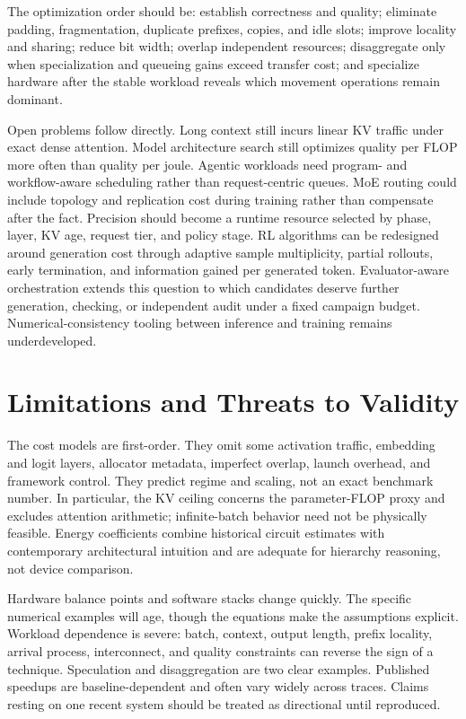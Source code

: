 \documentclass[journal]{IEEEtran}
\begin{document}
The optimization order should be: establish correctness and quality; eliminate padding, fragmentation, duplicate prefixes, copies, and idle slots; improve locality and sharing; reduce bit width; overlap independent resources; disaggregate only when specialization and queueing gains exceed transfer cost; and specialize hardware after the stable workload reveals which movement operations remain dominant.

Open problems follow directly. Long context still incurs linear KV traffic under exact dense attention. Model architecture search still optimizes quality per FLOP more often than quality per joule. Agentic workloads need program- and workflow-aware scheduling rather than request-centric queues. MoE routing could include topology and replication cost during training rather than compensate after the fact. Precision should become a runtime resource selected by phase, layer, KV age, request tier, and policy stage. RL algorithms can be redesigned around generation cost through adaptive sample multiplicity, partial rollouts, early termination, and information gained per generated token. Evaluator-aware orchestration extends this question to which candidates deserve further generation, checking, or independent audit under a fixed campaign budget. Numerical-consistency tooling between inference and training remains underdeveloped.

\section{Limitations and Threats to Validity}
The cost models are first-order. They omit some activation traffic, embedding and logit layers, allocator metadata, imperfect overlap, launch overhead, and framework control. They predict regime and scaling, not an exact benchmark number. In particular, the KV ceiling concerns the parameter-FLOP proxy and excludes attention arithmetic; infinite-batch behavior need not be physically feasible. Energy coefficients combine historical circuit estimates with contemporary architectural intuition and are adequate for hierarchy reasoning, not device comparison.

Hardware balance points and software stacks change quickly. The specific numerical examples will age, though the equations make the assumptions explicit. Workload dependence is severe: batch, context, output length, prefix locality, arrival process, interconnect, and quality constraints can reverse the sign of a technique. Speculation and disaggregation are two clear examples. Published speedups are baseline-dependent and often vary widely across traces. Claims resting on one recent system should be treated as directional until reproduced.
\end{document}
